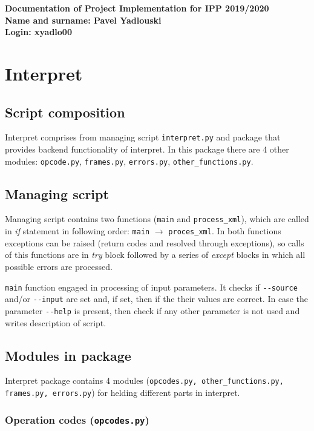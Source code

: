 \documentclass[10pt,a4paper]{article}
\begin{document}
\noindent\textbf{Documentation of Project Implementation for IPP 2019/2020\\
Name and surname: Pavel Yadlouski\\
Login: xyadlo00\\}

\section{Interpret}
\subsection{Script composition}

Interpret comprises from managing script \texttt{interpret.py} and package that
provides backend functionality of interpret. In this package there are 4 other
modules: \texttt{opcode.py}, \texttt{frames.py}, \texttt{errors.py}, 
\texttt{other\_functions.py}. 

\subsection{Managing script}

Managing script contains two functions (\texttt{main} and \texttt{process\_xml}),
which are called in \textit{if} statement in following order: \texttt{main} 
$\rightarrow$ \texttt{proces\_xml}. In both functions exceptions can be raised 
(return codes and resolved through exceptions), so calls of this functions are 
in \textit{try} block followed by a series of \textit{except} blocks in which 
all possible errors are processed.

\texttt{main} function engaged in processing of input parameters. It checks if 
\texttt{-{}-source} and/or \texttt{-{}-input} are set and, if set, then if the
their values are correct. In case the parameter \texttt{-{}-help} is present,
then check if any other parameter is not used and writes description of script.

\subsection{Modules in package}

Interpret package contains 4 modules (\texttt{opcodes.py, other\_functions.py, 
frames.py, errors.py}) for helding different parts in interpret.  

\subsubsection{Operation codes (\texttt{opcodes.py})}
\end{document}
